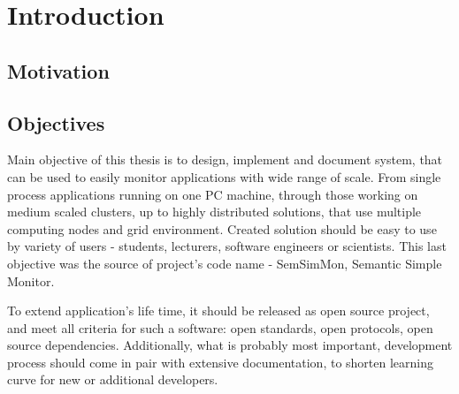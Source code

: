 %


\chapter{Introduction}
\label{cha:intro}


\section{Motivation}
\label{ch1:Motivation}





\section{Objectives}
\label{ch1:Objectives}

Main objective of this thesis is to design, implement and document system, that can be used to easily monitor
applications with wide range of scale. From single process applications running on one PC machine, through those
working on medium scaled clusters, up to highly distributed solutions, that use multiple computing nodes and grid
environment. Created solution should be easy to use by variety of users - students, lecturers, software engineers or
scientists. This last objective was the source of project's code name - SemSimMon, Semantic Simple Monitor. 

To extend application's life time, it should be released as open source project, and meet all criteria for such a
software: open standards, open protocols, open source dependencies. Additionally, what is probably most important,
development process should come in pair with extensive documentation, to shorten learning curve for new or additional
developers.

